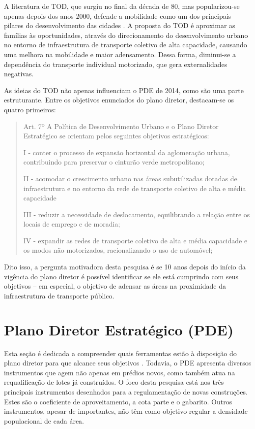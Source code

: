 A literatura de TOD, que surgiu no final da década de 80, mas popularizou-se apenas depois dos anos 2000, defende a mobilidade como um dos principais pilares do desenvolvimento das cidades \cite{Ibraeva2020}. A proposta do TOD é aproximar as famílias às oportunidades, através do direcionamento do desenvolvimento urbano no entorno de infraestrutura de transporte coletivo de alta capacidade, causando uma melhora na mobilidade e maior adensamento. Dessa forma, diminui-se a dependência do transporte individual motorizado, que gera externalidades negativas.

As ideias do TOD não apenas influenciam o PDE de 2014, como são uma parte estruturante. Entre os objetivos enunciados do plano diretor, destacam-se os quatro primeiros:

{\small
\begin{quote}
    Art. 7º A Política de Desenvolvimento Urbano 
    e o Plano Diretor Estratégico se orientam pelos 
    seguintes objetivos estratégicos:

    I - conter o processo de expansão horizontal da aglomeração urbana, contribuindo para preservar o cinturão verde metropolitano;

    II - acomodar o crescimento urbano nas áreas subutilizadas dotadas de infraestrutura e no entorno da rede de transporte coletivo de alta e média capacidade

    III - reduzir a necessidade de deslocamento, equilibrando a relação entre os locais de emprego e de moradia;

    IV - expandir as redes de transporte coletivo de alta e média capacidade e os modos não motorizados, racionalizando o uso de automóvel;
\end{quote}
}
Dito isso, a pergunta motivadora desta pesquisa é se 10 anos depois do início da vigência do plano diretor é possível identificar se ele está cumprindo com seus objetivos -- em especial, o objetivo de adensar as áreas na proximidade da infraestrutura de transporte público.

\section{Plano Diretor Estratégico (PDE)}
\label{sec:plano-diretor}

Esta seção é dedicada a compreender quais ferramentas estão à disposição do plano diretor para que alcance seus objetivos \cite{PDE2002, PDE2014, PDE2023}. Todavia, o PDE apresenta diversos instrumentos que agem não apenas em prédios novos, como também atua na requalificação de lotes já construídos. O foco desta pesquisa está nos três principais instrumentos desenhados para a regulamentação de novas construções. Estes são o coeficiente de aproveitamento, a cota parte e o gabarito. Outros instrumentos, apesar de importantes, não têm como objetivo regular a densidade populacional de cada área. 

